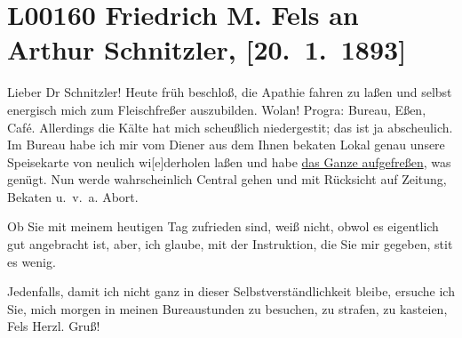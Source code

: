 

\section[Friedrich M. Fels an Arthur Schnitzler, {[}20. 1. 1893{]}]{L00160 Friedrich M. Fels an Arthur Schnitzler, {[}20. 1. 1893{]}}
\nopagebreak{}
\rehead{ }\normalsize\beginnumbering{}
\toendnotes[C]{\smallbreak\pagebreak[2]}
\toendnotes[C]{\smallbreak}
\pstart
           \noindent{}{\pb}Lieber Dr Schnitzler! Heute früh beschloß, die Apathie fahren zu
               laßen und selbst energisch mich zum Fleischfreßer auszubilden. Wolan! Progra{\geminationm}: Bureau, Eßen, Café. Allerdings die Kälte hat mich
               scheußlich niedergesti{\geminationm}t; das ist ja abscheulich. Im
               Bureau habe ich mir vom Diener aus dem Ihnen beka{\geminationn}ten
               Lokal genau unsere Speisekarte von neulich wi{[}e{]}derholen laßen und
               habe \uline{das Ganze aufgefreßen}, was genügt. Nun werde
               wahrscheinlich Central gehen und mit Rücksicht
               auf Zeitung, Beka{\geminationn}ten u. v. a. Abort.\pend
           
\pstart
           Ob Sie mit meinem heutigen Tag zufrieden sind, weiß \label{T_L00160-1v}\label{T_L00160-1} nicht, obwol es eigentlich \introOben{}gut\introOben{} angebracht ist, aber, ich glaube, mit der Instruktion, die Sie mir
               gegeben, sti{\geminationm}t es wenig.\pend
           
\pstart
           Jedenfalls, damit ich nicht ganz in dieser Selbstverständlichkeit bleibe, ersuche ich
               Sie, mich morgen in meinen Bureaustunden zu besuchen, zu strafen, zu kasteien,\pend
           \pstart \spacefill\mbox{Fels}\pend{}
\pstart
           \noindent{}Herzl. Gruß!\pend
           \endnumbering{}  
      